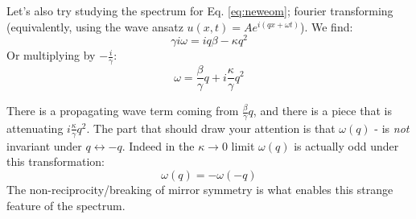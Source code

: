 Let's also try studying the spectrum for Eq. \eqref{eq:neweom}; fourier transforming (equivalently, using the wave ansatz $u(x, t) = Ae^{i(qx + \omega t)}$). We find:
\begin{equation}
    \gamma i \omega = i q \beta - \kappa q^2
\end{equation}
Or multiplying by $-\frac{i}{\gamma}$:
\begin{equation}
    \omega = \frac{\beta}{\gamma}q + i\frac{\kappa}{\gamma}q^2
\end{equation}

There is a propagating wave term coming from $\frac{\beta}{\gamma}q$, and there is a piece that is attenuating $i\frac{\kappa}{\gamma}q^2$. The part that should draw your attention is that $\omega(q)$ - is \emph{not} invariant under $q \leftrightarrow -q$. Indeed in the $\kappa \to 0$ limit $\omega(q)$ is actually odd under this transformation:
\begin{equation}
    \omega(q) = -\omega(-q)
\end{equation}
The non-reciprocity/breaking of mirror symmetry is what enables this strange feature of the spectrum.